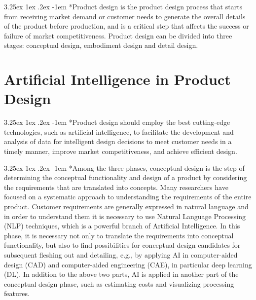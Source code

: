 \documentclass{article}
\makeatletter
\renewcommand\paragraph{\@startsection{paragraph}{4}{\z@}%
	{3.25ex \@plus1ex \@minus.2ex}%
	{-1em}%
	{\normalfont\normalsize}}
\makeatother
\begin{document}
	\paragraph*{Product design is the product design process that starts from receiving market demand or customer needs to generate the overall details of the product before production, and is a critical step that affects the success or failure of market competitiveness. Product design can be divided into three stages: conceptual design, embodiment design and detail design.}
	
	\section*{Artificial Intelligence in Product Design}
	
	\paragraph*{Product design should employ the best cutting-edge technologies, such as artificial intelligence, to facilitate the development and analysis of data for intelligent design decisions to meet customer needs in a timely manner, improve market competitiveness, and achieve efficient design.}
	
	\paragraph*{Among the three phases, conceptual design is the step of determining the conceptual functionality and design of a product by considering the requirements that are translated into concepts. Many researchers have focused on a systematic approach to understanding the requirements of the entire product. Customer requirements are generally expressed in natural language and in order to understand them it is necessary to use Natural Language Processing (NLP) techniques, which is a powerful branch of Artificial Intelligence. In this phase, it is necessary not only to translate the requirements into conceptual functionality, but also to find possibilities for conceptual design candidates for subsequent fleshing out and detailing, e.g., by applying AI in computer-aided design (CAD) and computer-aided engineering (CAE), in particular deep learning (DL). In addition to the above two parts, AI is applied in another part of the conceptual design phase, such as estimating costs and visualizing processing features.}
	
\end{document}
